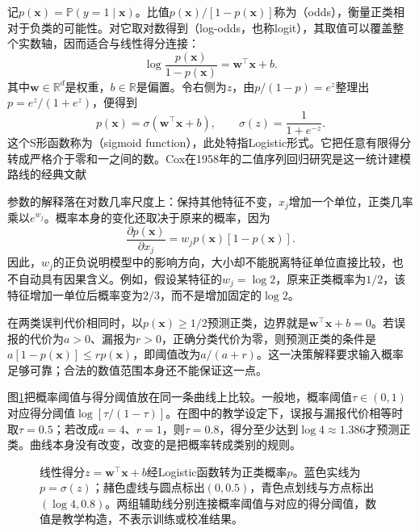 记$p(\bm{x})=\mathbb{P}(y=1\mid\bm{x})$。比值$p(\bm{x})/[1-p(\bm{x})]$称为（odds），衡量正类相对于负类的可能性。对它取对数得到（log-odds，也称logit），其取值可以覆盖整个实数轴，因而适合与线性得分连接：
\begin{equation}
  \label{eq:classification-logistic-logodds}
  \log\frac{p(\bm{x})}{1-p(\bm{x})}
  =\bm{w}^{\top}\bm{x}+b.
\end{equation}
其中$\bm{w}\in\mathbb{R}^{d}$是权重，$b\in\mathbb{R}$是偏置。令右侧为$z$，由$p/(1-p)=e^z$整理出$p=e^z/(1+e^z)$，便得到
\begin{equation}
  \label{eq:classification-logistic-sigmoid}
  p(\bm{x})=\sigma(\bm{w}^{\top}\bm{x}+b),
  \qquad
  \sigma(z)=\frac{1}{1+e^{-z}}.
\end{equation}
这个S形函数称为（sigmoid function），此处特指Logistic形式。它把任意有限得分转成严格介于零和一之间的数。Cox在1958年的二值序列回归研究是这一统计建模路线的经典文献

参数的解释落在对数几率尺度上：保持其他特征不变，$x_j$增加一个单位，正类几率乘以$e^{w_j}$。概率本身的变化还取决于原来的概率，因为
\[
  \frac{\partial p(\bm{x})}{\partial x_j}
  =w_jp(\bm{x})[1-p(\bm{x})].
\]
因此，$w_j$的正负说明模型中的影响方向，大小却不能脱离特征单位直接比较，也不自动具有因果含义。例如，假设某特征的$w_j=\log 2$，原来正类概率为$1/2$，该特征增加一单位后概率变为$2/3$，而不是增加固定的$\log 2$。

在两类误判代价相同时，以$p(\bm{x})\geq1/2$预测正类，边界就是$\bm{w}^{\top}\bm{x}+b=0$。若误报的代价为$a>0$、漏报为$r>0$，正确分类代价为零，则预测正类的条件是$a[1-p(\bm{x})]\leq rp(\bm{x})$，即阈值改为$a/(a+r)$。这一决策解释要求输入概率足够可靠；合法的数值范围本身还不能保证这一点。

图\ref{fig:classification-logistic-probability}把概率阈值与得分阈值放在同一条曲线上比较。一般地，概率阈值$\tau\in(0,1)$对应得分阈值$\log[\tau/(1-\tau)]$。在图中的教学设定下，误报与漏报代价相等时取$\tau=0.5$；若改成$a=4$、$r=1$，则$\tau=0.8$，得分至少达到$\log4\approx1.386$才预测正类。曲线本身没有改变，改变的是把概率转成类别的规则。
\begin{figure}[htbp]
  \centering
  
  \caption{线性得分$z=\bm{w}^{\top}\bm{x}+b$经Logistic函数转为正类概率$p$。蓝色实线为$p=\sigma(z)$；赭色虚线与圆点标出$(0,0.5)$，青色点划线与方点标出$(\log4,0.8)$。两组辅助线分别连接概率阈值与对应的得分阈值，数值是教学构造，不表示训练或校准结果。}
  \label{fig:classification-logistic-probability}
\end{figure}

